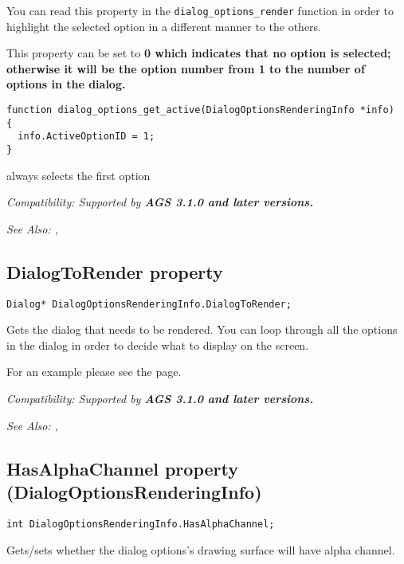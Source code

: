 You can read this property in the \verb$dialog_options_render$ function in order to highlight
the selected option in a different manner to the others.

This property can be set to \bf{0} which indicates that no option is selected; otherwise it
will be the option number from 1 to the number of options in the dialog.

\begin{verbatim}
function dialog_options_get_active(DialogOptionsRenderingInfo *info)
{
  info.ActiveOptionID = 1;
}
\end{verbatim}
always selects the first option

\it{Compatibility:} Supported by \bf{AGS 3.1.0} and later versions.

\it{See Also:} ,


\subsection{DialogToRender property}\label{DialogOptionsRenderingInfo.DialogToRender}%

\begin{verbatim}
Dialog* DialogOptionsRenderingInfo.DialogToRender;
\end{verbatim}
Gets the dialog that needs to be rendered. You can loop through all the options in the dialog
in order to decide what to display on the screen.

For an example please see the  page.

\it{Compatibility:} Supported by \bf{AGS 3.1.0} and later versions.

\it{See Also:} ,

\subsection{HasAlphaChannel property (DialogOptionsRenderingInfo)}\label{DialogOptionsRenderingInfo.HasAlphaChannel}%

\begin{verbatim}
int DialogOptionsRenderingInfo.HasAlphaChannel;
\end{verbatim}
Gets/sets whether the dialog options's drawing surface will have alpha channel.

